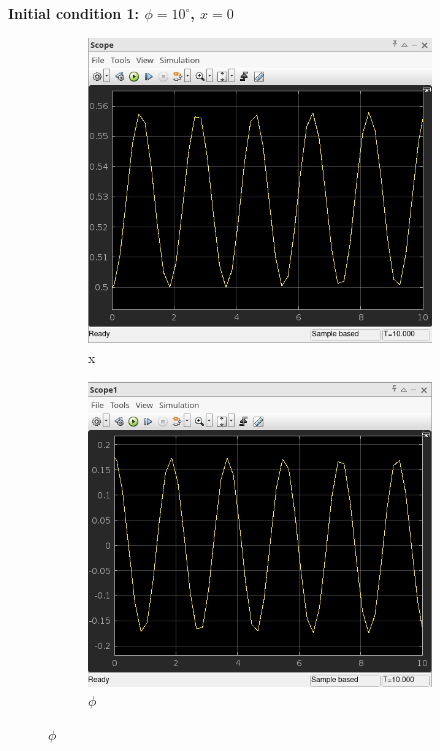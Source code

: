 \documentclass{article}
\begin{document}
\textbf{Initial condition 1: $\phi = 10^\circ$, $x = 0$}
\begin{figure}[htbp]
  \centering
  \begin{subfigure}[t]{0.4\linewidth}
    \centering
    \includegraphics[width=\linewidth]{simulink/init1_x.png}
    \caption{x}
  \end{subfigure}
  \begin{subfigure}[t]{0.4\linewidth}
    \centering
    \includegraphics[width=\linewidth]{simulink/init1_phi.png}
    \caption{$\phi$}
  \end{subfigure}
\end{figure}
\end{document}
